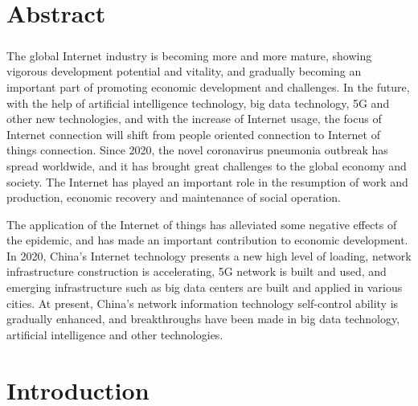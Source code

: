 \documentclass[12pt]{report}
\begin{document}
\tableofcontents
\listoffigures



\chapter*{\centering Abstract}
\paragraph{} The global Internet industry is becoming more and more mature, showing vigorous
development potential and vitality, and gradually becoming an important part of promoting
economic development and challenges. In the future, with the help of artificial intelligence
technology, big data technology, 5G and other new technologies, and with the increase of Internet
usage, the focus of Internet connection will shift from people oriented connection to Internet of
things connection. Since 2020, the novel coronavirus pneumonia outbreak has spread worldwide,
and it has brought great challenges to the global economy and society. The Internet has played an
important role in the resumption of work and production, economic recovery and maintenance of
social operation. 
\par The application of the Internet of things has alleviated some negative effects of
the epidemic, and has made an important contribution to economic development. In 2020, China’s
Internet technology presents a new high level of loading, network infrastructure construction is
accelerating, 5G network is built and used, and emerging infrastructure such as big data centers
are built and applied in various cities. At present, China’s network information technology
self-control ability is gradually enhanced, and breakthroughs have been made in big data
technology, artificial intelligence and other technologies.

 

\chapter{Introduction}
\end{document}
